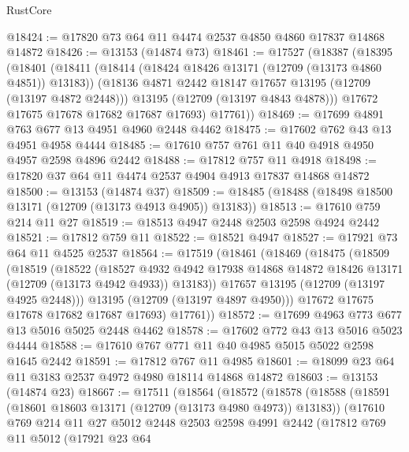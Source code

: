 \begin{lexlean}{RustCore}
\begin{coremodule}
@18424 := @17820 @73 @64 @11 @4474 @2537 @4850 @4860 @17837 @14868 @14872
@18426 := @13153 (@14874 @73)
@18461 := @17527
    (@18387
      (@18395
        (@18401
          (@18411
            (@18414 (@18424 @18426 @13171 (@12709 (@13173 @4860 @4851)) @13183))
            (@18136 @4871 @2442 @18147 @17657 @13195 (@12709 (@13197 @4872 @2448)))
            @13195
            (@12709 (@13197 @4843 @4878)))
          @17672
          @17675
          @17678
          @17682
          @17687
          @17693)
        @17761))
@18469 := @17699 @4891 @763 @677 @13 @4951 @4960 @2448 @4462
@18475 := @17602 @762 @43 @13 @4951 @4958 @4444
@18485 := @17610 @757 @761 @11 @40 @4918 @4950 @4957 @2598 @4896 @2442
@18488 := @17812 @757 @11 @4918
@18498 := @17820 @37 @64 @11 @4474 @2537 @4904 @4913 @17837 @14868 @14872
@18500 := @13153 (@14874 @37)
@18509 := @18485 (@18488 (@18498 @18500 @13171 (@12709 (@13173 @4913 @4905)) @13183))
@18513 := @17610 @759 @214 @11 @27
@18519 := @18513 @4947 @2448 @2503 @2598 @4924 @2442
@18521 := @17812 @759 @11
@18522 := @18521 @4947
@18527 := @17921 @73 @64 @11 @4525 @2537
@18564 := @17519
    (@18461
      (@18469
        (@18475
          (@18509
            (@18519
              (@18522
                (@18527
                  @4932
                  @4942
                  @17938
                  @14868
                  @14872
                  @18426
                  @13171
                  (@12709 (@13173 @4942 @4933))
                  @13183))
              @17657
              @13195
              (@12709 (@13197 @4925 @2448)))
            @13195
            (@12709 (@13197 @4897 @4950)))
          @17672
          @17675
          @17678
          @17682
          @17687
          @17693)
        @17761))
@18572 := @17699 @4963 @773 @677 @13 @5016 @5025 @2448 @4462
@18578 := @17602 @772 @43 @13 @5016 @5023 @4444
@18588 := @17610 @767 @771 @11 @40 @4985 @5015 @5022 @2598 @1645 @2442
@18591 := @17812 @767 @11 @4985
@18601 := @18099 @23 @64 @11 @3183 @2537 @4972 @4980 @18114 @14868 @14872
@18603 := @13153 (@14874 @23)
@18667 := @17511
    (@18564
      (@18572
        (@18578
          (@18588
            (@18591 (@18601 @18603 @13171 (@12709 (@13173 @4980 @4973)) @13183))
            (@17610
              @769
              @214
              @11
              @27
              @5012
              @2448
              @2503
              @2598
              @4991
              @2442
              (@17812
                @769
                @11
                @5012
                (@17921
                  @23
                  @64

\end{coremodule}
\end{lexlean}
